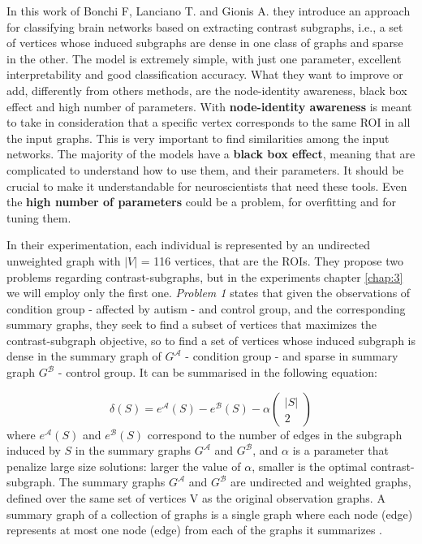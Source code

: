 In this work of Bonchi F, Lanciano T. and Gionis A. \cite{lanciano2020cs} they introduce an approach for classifying brain networks based on extracting contrast subgraphs, i.e., a set of vertices whose induced subgraphs are dense in one class of graphs and sparse in the other. The model is extremely simple, with just one parameter, excellent interpretability and good classification accuracy. What they want to improve or add, differently from others methods, are the node-identity awareness, black box effect and high number of parameters. With \textbf{node-identity awareness} is meant to take in consideration that a specific vertex corresponds to the same ROI in all the input graphs. This is very important to find similarities among the input networks. The majority of the models have a \textbf{black box effect}, meaning that are complicated to understand how to use them, and their parameters. It should be crucial to make it understandable for neuroscientists that need these tools. Even the \textbf{high number of parameters} could be a problem, for overfitting and for tuning them. 
\vspace{0.5cm}

In their experimentation, each individual is represented by an undirected unweighted graph with $|V|$ = 116 vertices, that are the ROIs. They propose two problems regarding contrast-subgraphs, but in the experiments chapter \ref{chap:3} we will employ only the first one. \textit{Problem 1} states that given the observations of condition group - affected by autism - and control group, and the corresponding summary graphs, they seek to find a subset of vertices that maximizes the contrast-subgraph objective, so to find a set of vertices whose induced subgraph is dense in the summary graph of $G^{\mathcal{A}}$ - condition group - and sparse in summary graph $G^{\mathcal{B}}$ - control group. It can be summarised in the following equation:
\vspace{0.5cm}

\begin{equation}
	\delta(S)=e^{\mathcal{A}}(S)-e^{\mathcal{B}}(S)-\alpha\left(\begin{array}{c}
		|S| \\
		2
	\end{array}\right)
\end{equation}
where $ e^{\mathcal{A}}(S) $ and $ e^{\mathcal{B}}(S) $ correspond to the number of edges in the subgraph induced by $ S $ in the summary graphs $G^{\mathcal{A}}$ and $G^{\mathcal{B}}$, and $ \alpha $ is a parameter that penalize large size solutions: larger the value of $\alpha$, smaller is the optimal contrast-subgraph. The summary graphs $G^{\mathcal{A}}$ and $G^{\mathcal{B}}$ are undirected and weighted graphs, defined over the same set of vertices V as the original observation graphs. A summary graph of a collection of graphs is a single graph where each node (edge) represents at most one node (edge) from each of the graphs it summarizes \cite{6596128}.
\vspace{0.5cm}

